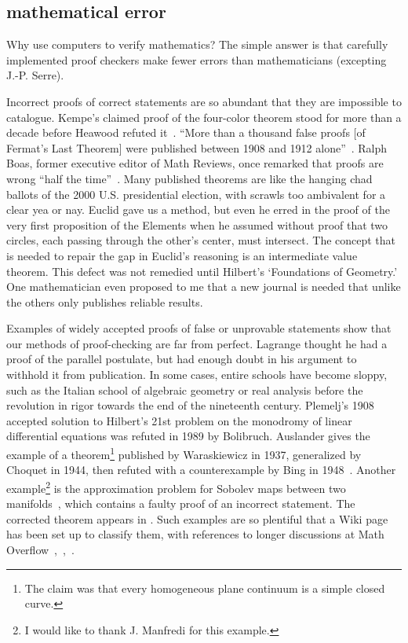 \documentclass{llncs}
\begin{document}

\subsection{mathematical error}

Why use computers to verify mathematics?  The simple answer is that
carefully implemented proof checkers make fewer errors than
mathematicians (excepting J.-P. Serre).

Incorrect proofs of correct statements are so abundant that they are
impossible to catalogue.  Kempe's claimed proof of the four-color
theorem stood for more than a decade before Heawood refuted
it~\cite[p.~115]{Mac}.  ``More than a thousand false proofs [of
Fermat's Last Theorem] were published between 1908 and 1912
alone''~\cite{Corry}.  Ralph Boas, former executive editor of Math
Reviews, once remarked that proofs are wrong ``half the
time''~\cite{Aus}.  Many published theorems are like the hanging chad
ballots of the 2000 U.S. presidential election, with scrawls too
ambivalent for a clear yea or nay.  Euclid gave us a method, but even
he erred in the proof of the very first proposition of the Elements
when he assumed without proof that two circles, each passing through
the other's center, must intersect.  The concept that is needed to
repair the gap in Euclid's reasoning is an intermediate value theorem.
This defect was not remedied until Hilbert's `Foundations of
Geometry.'  One mathematician even proposed to me that a new journal
is needed that unlike the others only publishes reliable results.

Examples of widely accepted proofs of false or unprovable statements
show that our methods of proof-checking are far from perfect.
Lagrange thought he had a proof of the parallel postulate, but had
enough doubt in his argument to withhold it from publication.  In some
cases, entire schools have become sloppy, such as the Italian school
of algebraic geometry or real analysis before the revolution in rigor
towards the end of the nineteenth century.  Plemelj's 1908 accepted
solution to Hilbert's 21st problem on the monodromy of linear
differential equations was refuted in 1989 by Bolibruch.  Auslander
gives the example of a theorem\footnote{The claim was that every
  homogeneous plane continuum is a simple closed curve.}  published by
Waraskiewicz in 1937, generalized by Choquet in 1944, then refuted
with a counterexample by Bing in 1948~\cite{Aus}.  Another
example\footnote{I would like to thank J. Manfredi for this example.}
is the approximation problem for Sobolev maps between two
manifolds~\cite{Bethuel}, which contains a faulty proof of an
incorrect statement.  The corrected theorem appears in \cite{Hang}.
Such examples are so plentiful that a Wiki page has been set up to
classify them, with references to longer discussions at Math
Overflow~\cite{WikiPIP},~\cite{Over2},~\cite{Over1}.
\end{document}
